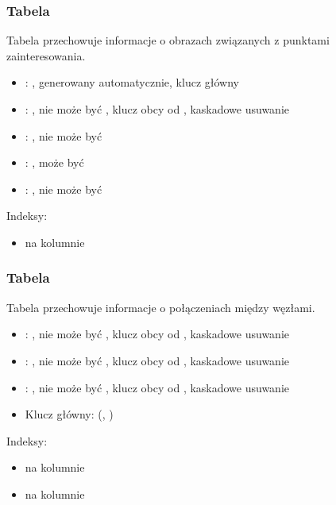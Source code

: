 \subsubsection{Tabela }
Tabela przechowuje informacje o obrazach związanych z punktami zainteresowania.
\begin{itemize}
    \item {}: , generowany automatycznie, klucz główny
    \item {}: , nie może być , klucz obcy od , kaskadowe usuwanie
    \item {}: , nie może być 
    \item {}: , może być 
    \item {}: , nie może być 
\end{itemize}
Indeksy:
\begin{itemize}
    \item {} na kolumnie 
\end{itemize}

\subsubsection{Tabela }
Tabela przechowuje informacje o połączeniach między węzłami.
\begin{itemize}
    \item {}: , nie może być , klucz obcy od , kaskadowe usuwanie
    \item {}: , nie może być , klucz obcy od , kaskadowe usuwanie
    \item {}: , nie może być , klucz obcy od , kaskadowe usuwanie
    \item Klucz główny: (, )
\end{itemize}
Indeksy:
\begin{itemize}
    \item {} na kolumnie 
    \item {} na kolumnie 
\end{itemize}

